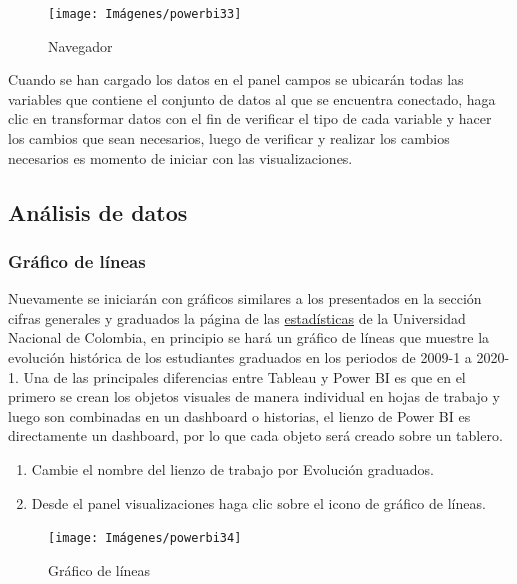 \documentclass[
]{book}
\begin{document}
\begin{figure}

{\centering \texttt{[image: Imágenes/powerbi33]} 

}

\caption{Navegador}\label{fig:Navegador-fig}
\end{figure}

Cuando se han cargado los datos en el panel campos se ubicarán todas las variables que contiene el conjunto de datos al que se encuentra conectado, haga clic en transformar datos con el fin de verificar el tipo de cada variable y hacer los cambios que sean necesarios, luego de verificar y realizar los cambios necesarios es momento de iniciar con las visualizaciones.

\hypertarget{analisisdatospowerbi}{%
\subsection{Análisis de datos}\label{analisisdatospowerbi}}

\hypertarget{graficolineaspowerbi}{%
\subsubsection{Gráfico de líneas}\label{graficolineaspowerbi}}

Nuevamente se iniciarán con gráficos similares a los presentados en la sección cifras generales y graduados la página de las \href{http://estadisticas.unal.edu.co/home/}{estadísticas} de la Universidad Nacional de Colombia, en principio se hará un gráfico de líneas que muestre la evolución histórica de los estudiantes graduados en los periodos de 2009-1 a 2020-1. Una de las principales diferencias entre Tableau y Power BI es que en el primero se crean los objetos visuales de manera individual en hojas de trabajo y luego son combinadas en un dashboard o historias, el lienzo de Power BI es directamente un dashboard, por lo que cada objeto será creado sobre un tablero.

\begin{enumerate}
\def\labelenumi{\arabic{enumi}.}
\item
  Cambie el nombre del lienzo de trabajo por Evolución graduados.
\item
  Desde el panel visualizaciones haga clic sobre el icono de gráfico de líneas.
\end{enumerate}

\begin{figure}

{\centering \texttt{[image: Imágenes/powerbi34]} 

}

\caption{Gráfico de líneas}\label{fig:Agregargraficolineas-fig}
\end{figure}
\end{document}

